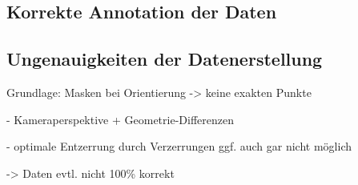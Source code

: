 \subsection{Korrekte Annotation der Daten}  %
\label{sec:korrekte_annotation}  %

\todo{}

\subsection{Ungenauigkeiten der Datenerstellung}  %
\label{sec:daten_ungenauigkeiten}

Grundlage: Masken bei Orientierung -> keine exakten Punkte

- Kameraperspektive + Geometrie-Differenzen

- optimale Entzerrung durch Verzerrungen ggf. auch gar nicht möglich

->  Daten evtl. nicht 100\% korrekt

\todo{}
